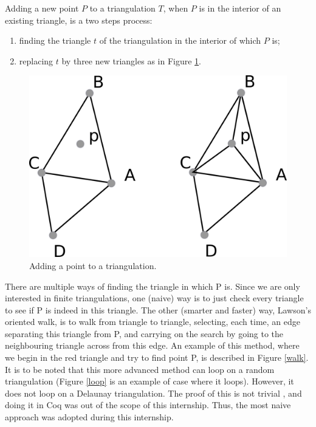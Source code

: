 \documentclass[a4paper,10pt]{article}
\begin{document}
Adding a new point $P$ to a triangulation $T$, when $P$ is in the interior of an existing triangle, is a two steps process:
\begin{enumerate}
\item finding the triangle $t$ of the triangulation in the interior of which $P$ is;
\item replacing $t$ by three new triangles as in Figure \ref{adding}.
\end{enumerate}
\begin{figure}
\centering
\includegraphics[scale=2]{adding}
\caption{\label{adding} Adding a point to a triangulation.}
\end{figure}

There are multiple ways of finding the triangle in which P is. Since we are only interested in finite triangulations, one (naive) way is to just check every triangle to see if P is indeed in this triangle. The other (smarter and faster) way, Lawson's oriented walk, is to walk from triangle to triangle, selecting, each time, an edge separating this triangle from P, and carrying on the search by going to the neighbouring triangle across from this edge. An example of this method, where we begin in the red triangle and try to find point P, is described in Figure \ref{walk}. It is to be noted that this more advanced method can loop on a random triangulation (Figure \ref{loop} is an example of case where it loops). However, it does not loop on a Delaunay triangulation. The proof of this is not trivial \cite{lawson}, and doing it in {\sc Coq} was out of the scope of this internship.
Thus, the most naive approach was adopted during this internship.
\end{document}
